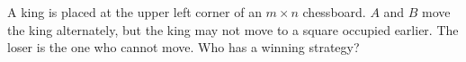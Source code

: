A king is placed at the upper left corner of an $m \times n$ chessboard. $A$ and $B$ move the king alternately, but the king may not move to a square occupied earlier. The loser is the one who cannot move. Who has a winning strategy?
